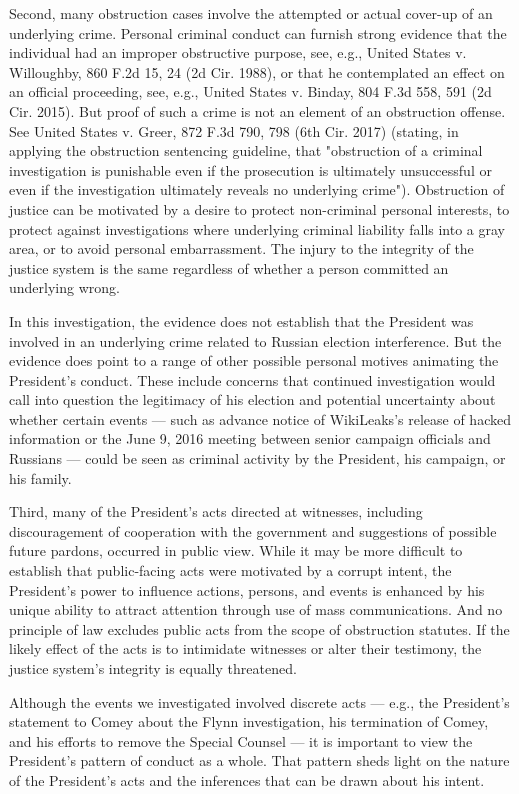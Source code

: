 Second, many obstruction cases involve the attempted or actual cover-up of an underlying crime.
Personal criminal conduct can furnish strong evidence that the individual had an improper obstructive purpose, see, e.g., United States v. Willoughby, 860 F.2d 15, 24 (2d Cir. 1988), or that he contemplated an effect on an official proceeding, see, e.g., United States v. Binday, 804 F.3d 558, 591 (2d Cir. 2015).
But proof of such a crime is not an element of an obstruction offense.
See United States v. Greer, 872 F.3d 790, 798 (6th Cir. 2017) (stating, in applying the obstruction sentencing guideline, that "obstruction of a criminal investigation is punishable even if the prosecution is ultimately unsuccessful or even if the investigation ultimately reveals no underlying crime").
Obstruction of justice can be motivated by a desire to protect non-criminal personal interests, to protect against investigations where underlying criminal liability falls into a gray area, or to avoid personal embarrassment.
The injury to the integrity of the justice system is the same regardless of whether a person committed an underlying wrong.

In this investigation, the evidence does not establish that the President was involved in an underlying crime related to Russian election interference.
But the evidence does point to a range of other possible personal motives animating the President's conduct.
These include concerns that continued investigation would call into question the legitimacy of his election and potential uncertainty about whether certain events — such as advance notice of WikiLeaks's release of hacked information or the June 9, 2016 meeting between senior campaign officials and Russians — could be seen as criminal activity by the President, his campaign, or his family.

Third, many of the President's acts directed at witnesses, including discouragement of cooperation with the government and suggestions of possible future pardons, occurred in public view.
While it may be more difficult to establish that public-facing acts were motivated by a corrupt intent, the President's power to influence actions, persons, and events is enhanced by his unique ability to attract attention through use of mass communications.
And no principle of law excludes public acts from the scope of obstruction statutes.
If the likely effect of the acts is to intimidate witnesses or alter their testimony, the justice system's integrity is equally threatened.

Although the events we investigated involved discrete acts — e.g., the President's statement to Comey about the Flynn investigation, his termination of Comey, and his efforts to remove the Special Counsel — it is important to view the President's pattern of conduct as a whole.
That pattern sheds light on the nature of the President's acts and the inferences that can be drawn about his intent.

